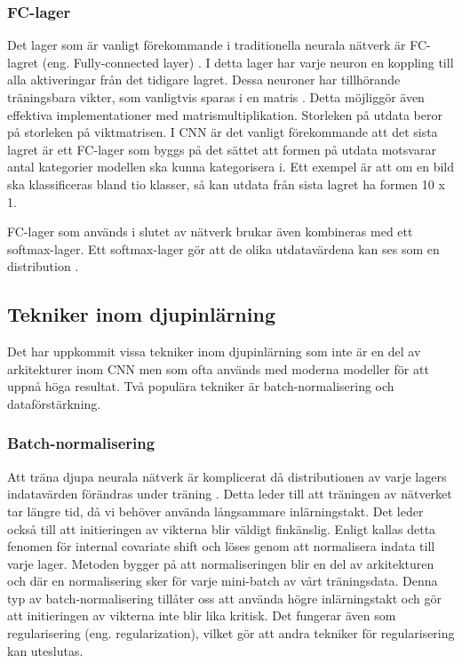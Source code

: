 \documentclass[]{kththesis}
\begin{document}
\subsubsection{FC-lager}
Det lager som är vanligt förekommande i traditionella neurala nätverk är FC-lagret (eng. Fully-connected layer) \parencite{krizhevsky2012imagenet}. I detta lager har varje neuron en koppling till alla aktiveringar från det tidigare lagret. Dessa neuroner har tillhörande träningsbara vikter, som vanligtvis sparas i en matris \parencite{Goodfellow-et-al-2016}. Detta möjliggör även effektiva implementationer med matrismultiplikation. Storleken på utdata beror på storleken på viktmatrisen. I CNN är det vanligt förekommande att det sista lagret är ett FC-lager som byggs på det sättet att formen på utdata motsvarar antal kategorier modellen ska kunna kategorisera i. Ett exempel är att om en bild ska klassificeras bland tio klasser, så kan utdata från sista lagret ha formen 10 x 1.

FC-lager som används i slutet av nätverk brukar även kombineras med ett softmax-lager. Ett softmax-lager gör att de olika utdatavärdena kan ses som en distribution \parencite{Goodfellow-et-al-2016}.

\subsection{Tekniker inom djupinlärning}
Det har uppkommit vissa tekniker inom djupinlärning som inte är en del av arkitekturer inom CNN men som ofta används med moderna modeller för att uppnå höga resultat. Två populära tekniker är batch-normalisering och dataförstärkning.

\subsubsection{Batch-normalisering}
Att träna djupa neurala nätverk är komplicerat då distributionen av varje lagers indatavärden förändras under träning \parencite{ioffe2015batch}. Detta leder till att träningen av nätverket tar längre tid, då vi behöver använda långsammare inlärningstakt. Det leder också till att initieringen av vikterna blir väldigt finkänslig. Enligt \textcite{ioffe2015batch} kallas detta fenomen för internal covariate shift och löses genom att normalisera indata till varje lager. Metoden bygger på att normaliseringen blir en del av arkitekturen och där en normalisering sker för varje mini-batch av vårt träningsdata. Denna typ av batch-normalisering tillåter oss att använda högre inlärningstakt och gör att initieringen av vikterna inte blir lika kritisk. Det fungerar även som regularisering (eng. regularization), vilket gör att andra tekniker för regularisering kan uteslutas.
\end{document}
